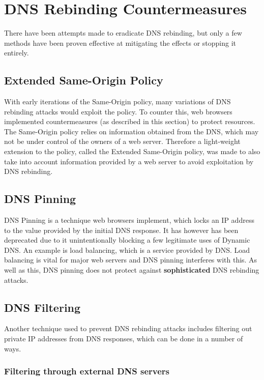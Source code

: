 \chapter{DNS Rebinding Countermeasures}

There have been attempts made to eradicate DNS rebinding, but only
a few methods have been proven effective at mitigating the effects
or stopping it entirely.

\section{Extended Same-Origin Policy}

With early iterations of the Same-Origin policy, many variations of
DNS rebinding attacks would exploit the policy. To counter this, web
browsers implemented countermeasures (as described in this section) to
protect resources. The Same-Origin policy relies on information
obtained from the DNS, which may not be under control of the owners
of a web server. Therefore a light-weight extension to the policy,
called the Extended Same-Origin policy, was made to also take into
account information provided by a web server to avoid exploitation by
DNS rebinding\textsuperscript{\cite{johns2013eradicating}}.

\section{DNS Pinning}

DNS Pinning is a technique web browsers implement, which locks an IP
address to the value provided by the initial DNS response. It has
however has been deprecated due to it unintentionally blocking a
few legitimate uses of Dynamic DNS. An example is load balancing,
which is a service provided by DNS. Load balancing is vital for
major web servers and DNS pinning interferes with this. As well as
this, DNS pinning does not protect against \textbf{sophisticated}
DNS rebinding attacks.

\section{DNS Filtering}

Another technique used to prevent DNS rebinding attacks includes
filtering out private IP addresses from DNS responses, which can be
done in a number of ways.

\subsection{Filtering through external DNS servers}

